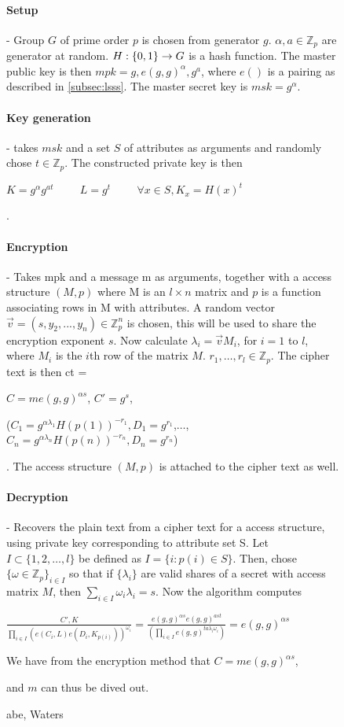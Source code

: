 \begin{figure}
\begin{mdframed}
\paragraph{Setup} - Group $G$ of prime order $p$ is chosen from generator $g$. $\alpha, a \in \mathbb{Z}_p$ are generator at random. $H: \{0,1\}\* \rightarrow G$ is a hash function. The master public key is then $mpk = g, e(g,g)^{\alpha}, g^a$, where $e()$ is a pairing as described in \ref{subsec:lsss}. The master secret key is $msk = g^{\alpha}$.
\
\paragraph{Key generation} - takes $msk$ and a set $S$ of attributes as arguments and randomly chose $t \in \mathbb{Z}_p$. The constructed private key is then \\ \centerline{$K = g^{\alpha}g^{at}\hspace{1cm} L = g^t \hspace{1cm}   \forall x\in S, K_x = H(x)^t$}.
\\
\paragraph{Encryption} - Takes mpk and a message m as arguments, together with a access structure $(M,p)$ where M is an $l\times n$ matrix and $p$ is a function associating rows in M with attributes. A random vector $\vec{v} = (s, y_2, ..., y_n)\in \mathbb{Z}_p^n$ is chosen, this will be used to share the encryption exponent $s$. Now calculate $\lambda_i = \vec{v} M_i$, for $i=1$ to $l$, where $M_i$ is the $i$th row of the matrix $M$. $r_1,\dots,r_l \in \mathbb{Z}_p$. The cipher text is then ct = \\
\centerline{$C=me(g,g)^{\alpha s}$, $C'=g^s$,}
\centerline{($C_1 = g^{\alpha \lambda_1} H(p(1))^{-r_1}, D_1=g^{r_1}$,$\dots$,$C_n = g^{\alpha \lambda_n} H(p(n))^{-r_n}, D_n=g^{r_n}$)}.
The access structure $(M,p)$ is attached to the cipher text as well.
\\
\paragraph{Decryption} - Recovers the plain text from a cipher text for a access structure, using private key corresponding to attribute set S. Let $I \subset \{1,2,\dots,l\}$ be defined as $I = \{i : p(i) \in S\}$. Then, chose $\{\omega \in \mathbb{Z}_p\}_{i\in I}$ so that if $\{\lambda_i\}$ are valid shares of a secret with access matrix $M$, then $\sum_{i\in I}\omega_i \lambda_i = s$. Now the algorithm computes
\centerline{$\frac{C',K }{\prod_{i\in I}(e(C_i,L)e(D_i,K_{p(i)}))^{\omega_i}} = \frac{e(g,g)^{\alpha s}e(g,g)^{ast}}{(\prod_{i\in I}e(g,g)^{ta\lambda_i\omega_i})}=e(g,g)^{\alpha s}$}
\centerline{We have from the encryption method that $C=me(g,g)^{\alpha s}$, }
\centerline{and $m$ can thus be dived out.}


\caption{\gls{abe}, Waters\cite{abe_waters09}}
\label{fig:abe_math}
\end{mdframed}
\end{figure}
